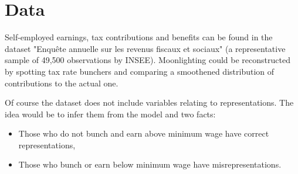 \documentclass{article}
\begin{document}
\section{Data}

Self-employed earnings, tax contributions and benefits can be found in the dataset "Enquête annuelle sur les revenus fiscaux et sociaux" (a representative sample of 49,500 observations by INSEE). Moonlighting could be reconstructed by spotting tax rate bunchers and comparing a smoothened distribution of contributions to the actual one.

Of course the dataset does not include variables relating to representations. The idea would be to infer them from the model and two facts:
\begin{itemize}
    \item Those who do not bunch and earn above minimum wage have correct representations,
    \item Those who bunch or earn below minimum wage have misrepresentations. 
\end{itemize}



\end{document}
